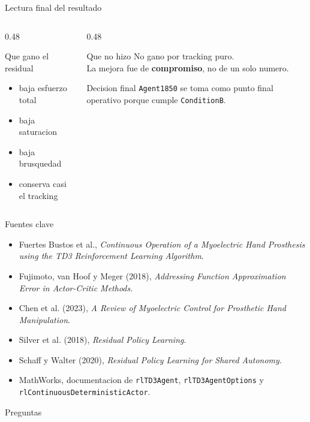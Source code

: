 \documentclass[aspectratio=169,11pt]{beamer}
\begin{document}
\begin{frame}{Lectura final del resultado}
\begin{columns}[T]
\begin{column}{0.48\linewidth}
\begin{block}{Que gano el residual}
\begin{itemize}
\item baja esfuerzo total
\item baja saturacion
\item baja brusquedad
\item conserva casi el tracking
\end{itemize}
\end{block}
\end{column}
\begin{column}{0.48\linewidth}
\begin{alertblock}{Que no hizo}
No gano por tracking puro.\\
La mejora fue de \textbf{compromiso}, no de un solo numero.
\end{alertblock}

\begin{block}{Decision final}
\texttt{Agent1850} se toma como punto final operativo porque cumple \texttt{ConditionB}.
\end{block}
\end{column}
\end{columns}
\end{frame}

\begin{frame}{Fuentes clave}
\small
\begin{itemize}
\item Fuertes Bustos et al., \emph{Continuous Operation of a Myoelectric Hand Prosthesis using the TD3 Reinforcement Learning Algorithm}.
\item Fujimoto, van Hoof y Meger (2018), \emph{Addressing Function Approximation Error in Actor-Critic Methods}.
\item Chen et al. (2023), \emph{A Review of Myoelectric Control for Prosthetic Hand Manipulation}.
\item Silver et al. (2018), \emph{Residual Policy Learning}.
\item Schaff y Walter (2020), \emph{Residual Policy Learning for Shared Autonomy}.
\item MathWorks, documentacion de \texttt{rlTD3Agent}, \texttt{rlTD3AgentOptions} y \texttt{rlContinuousDeterministicActor}.
\end{itemize}

\vfill
\centering
\Large Preguntas
\end{frame}
\end{document}
